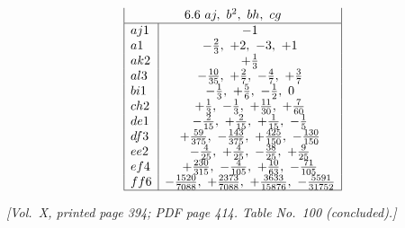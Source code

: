\documentclass[11pt]{article}
\begin{document}
\[\begin{array}{|l|c|}
\multicolumn{2}{|c|}{6.6\ aj,\ b^{2},\ bh,\ cg}\\\hline
aj1 & -1 \\
a1 & -\tfrac{2}{3},\ +2,\ -3,\ +1 \\
ak2 & +\tfrac{1}{3} \\
al3 & -\tfrac{10}{35},\ +\tfrac{2}{7},\ -\tfrac{4}{7},\ +\tfrac{3}{7} \\
bi1 & -\tfrac{1}{3},\ +\tfrac{5}{6},\ -\tfrac{1}{2},\ 0 \\
ch2 & +\tfrac{1}{3},\ -\tfrac{1}{3},\ +\tfrac{11}{30},\ +\tfrac{7}{60} \\
de1 & -\tfrac{2}{15},\ +\tfrac{2}{15},\ +\tfrac{1}{15},\ -\tfrac{1}{5} \\
df3 & +\tfrac{59}{375},\ -\tfrac{143}{375},\ +\tfrac{425}{150},\ -\tfrac{130}{150} \\
ee2 & -\tfrac{4}{25},\ +\tfrac{4}{25},\ -\tfrac{38}{25},\ +\tfrac{9}{25} \\
ef4 & +\tfrac{230}{315},\ -\tfrac{4}{105},\ +\tfrac{10}{63},\ -\tfrac{71}{105} \\
ff6 & -\tfrac{1520}{7088},\ +\tfrac{2373}{7088},\ +\tfrac{3633}{15876},\ -\tfrac{5591}{31752} \\\hline
\end{array}
\]

\newpage

\noindent\textit{[Vol.~X, printed page 394; PDF page 414. Table No.~100 (concluded).]}
\end{document}
